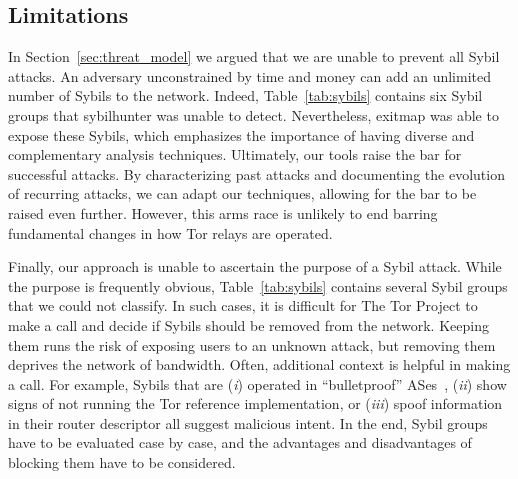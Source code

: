 \subsection{Limitations}
\label{sec:limitations}
In Section~\ref{sec:threat_model} we argued that we are unable to prevent all
Sybil attacks.  An adversary unconstrained by time and money can add an
unlimited number of Sybils to the network.  Indeed, Table~\ref{tab:sybils}
contains six Sybil groups that sybilhunter was unable to detect.  Nevertheless,
exitmap was able to expose these Sybils, which emphasizes the importance of
having diverse and complementary analysis techniques.  Ultimately, our tools
raise the bar for successful attacks.  By characterizing past attacks and
documenting the evolution of recurring attacks, we can adapt our techniques,
allowing for the bar to be raised even further.  However, this arms race is
unlikely to end barring fundamental changes in how Tor relays are operated.

Finally, our approach is unable to ascertain the purpose of a Sybil attack.
While the purpose is frequently obvious, Table~\ref{tab:sybils} contains several
Sybil groups that we could not classify.  In such cases, it is difficult for The
Tor Project to make a call and decide if Sybils should be removed from the
network.  Keeping them runs the risk of exposing users to an unknown attack, but
removing them deprives the network of bandwidth.  Often, additional context is
helpful in making a call.  For example, Sybils that are (\emph{i}) operated in
``bulletproof'' ASes~\cite{Konte2015a}, (\emph{ii}) show signs of not running
the Tor reference implementation, or (\emph{iii}) spoof information in their
router descriptor all suggest malicious intent.  In the end, Sybil groups have
to be evaluated case by case, and the advantages and disadvantages of blocking
them have to be considered.
